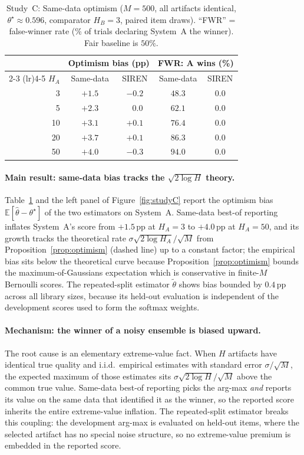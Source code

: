 \begin{table}[h]
\centering
\caption{Study~C: Same-data optimism ($M{=}500$, all artifacts identical, $\theta^\star \approx 0.596$, comparator $H_B{=}3$, paired item draws). ``FWR'' = false-winner rate (\% of trials declaring System~A the winner). Fair baseline is $50\%$.}
\label{tab:studyC}
\small
\begin{tabular}{r cc cc}
\toprule
& \multicolumn{2}{c}{Optimism bias (pp)} & \multicolumn{2}{c}{FWR: A wins (\%)} \\
\cmidrule(lr){2-3} \cmidrule(lr){4-5}
$H_A$ & Same-data & SIREN & Same-data & SIREN \\
\midrule
3   & $+1.5$ & $-0.2$ & $48.3$ & $0.0$ \\
5   & $+2.3$ & $\,\,\,\,0.0$ & $62.1$ & $0.0$ \\
10  & $+3.1$ & $+0.1$ & $76.4$ & $0.0$ \\
20  & $+3.7$ & $+0.1$ & $86.3$ & $0.0$ \\
50  & $+4.0$ & $-0.3$ & $94.0$ & $0.0$ \\
\bottomrule
\end{tabular}
\end{table}

\paragraph{Main result: same-data bias tracks the $\sqrt{2\log H}$ theory.}
Table~\ref{tab:studyC} and the left panel of Figure~\ref{fig:studyC} report the optimism bias $\mathbb{E}[\widehat\theta - \theta^\star]$ of the two estimators on System~A.
Same-data best-of reporting inflates System~A's score from $+1.5$\,pp at $H_A{=}3$ to $+4.0$\,pp at $H_A{=}50$, and its growth tracks the theoretical rate $\sigma\sqrt{2\log H_A}/\sqrt{M}$ from Proposition~\ref{prop:optimism} (dashed line) up to a constant factor; the empirical bias sits below the theoretical curve because Proposition~\ref{prop:optimism} bounds the maximum-of-Gaussians expectation which is conservative in finite-$M$ Bernoulli scores.
The repeated-split estimator $\widetilde\theta$ shows bias bounded by $0.4$\,pp across all library sizes, because its held-out evaluation is independent of the development scores used to form the softmax weights.

\paragraph{Mechanism: the winner of a noisy ensemble is biased upward.}
The root cause is an elementary extreme-value fact.
When $H$ artifacts have identical true quality and i.i.d.\ empirical estimates with standard error $\sigma/\sqrt{M}$, the expected maximum of those estimates sits $\sigma\sqrt{2\log H}/\sqrt{M}$ above the common true value.
Same-data best-of reporting picks the arg-max \emph{and} reports its value on the same data that identified it as the winner, so the reported score inherits the entire extreme-value inflation.
The repeated-split estimator breaks this coupling: the development arg-max is evaluated on held-out items, where the selected artifact has no special noise structure, so no extreme-value premium is embedded in the reported score.


